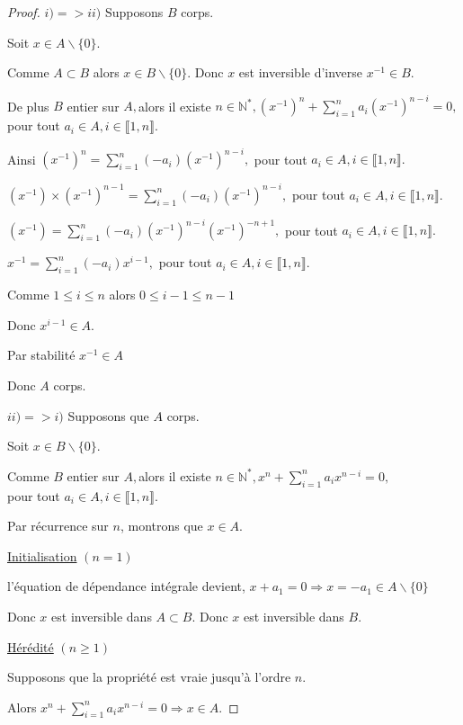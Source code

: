 \begin{proof}
	$i)=>ii)$ Supposons $B$ corps.
	
	Soit $x\in A\backslash \{0\}.$
	
	Comme $A\subset B$ alors $x\in B\backslash \{0\}$. Donc $x$ est inversible
	d'inverse $x^{-1}\in B.$
	
	De plus $B$ entier sur $A,$alors il existe $n\in \mathbb{N}^{\ast },(x^{-1})^{n}+\sum\limits_{i=1}^{n}a_{i}(x^{-1})^{n-i}=0,$ pour tout 
	$a_{i}\in A,i\in \llbracket 1, n \rrbracket.$
	
	Ainsi $(x^{-1})^{n}=\sum\limits_{i=1}^{n}(-a_{i})(x^{-1})^{n-i},$ pour tout $%
	a_{i}\in A,i\in \llbracket 1, n \rrbracket.$
	
	$(x^{-1})\times (x^{-1})^{n-1}=\sum\limits_{i=1}^{n}(-a_{i})(x^{-1})^{n-i},$
	pour tout $a_{i}\in A,i\in \llbracket 1, n \rrbracket.$
	
	$(x^{-1})=\sum\limits_{i=1}^{n}(-a_{i})(x^{-1})^{n-i}(x^{-1})^{-n+1},$ pour
	tout $a_{i}\in A,i\in \llbracket 1, n \rrbracket.$
	
	$x^{-1}=\sum\limits_{i=1}^{n}(-a_{i})x^{i-1},$ pour tout $a_{i}\in A,i\in
	\llbracket 1, n \rrbracket.$
	
	Comme  $1\leq i\leq n$ alors $0\leq i-1\leq n-1$
	
	Donc $x^{i-1}\in A$.
	
	Par stabilité $x^{-1}\in A$
	
	Donc $A$ corps.
	
	$ii)=>i)$ Supposons que $A$ corps.
	
	Soit $x\in B\backslash \{0\}.$
	
	Comme $B$ entier sur $A,$alors il existe $n\in \mathbb{N}^{\ast },x^{n}+\sum\limits_{i=1}^{n}a_{i}x^{n-i}=0,$\\ pour tout $a_{i}\in
	A,i\in \llbracket 1, n \rrbracket.$
	\newpage
	
	Par récurrence sur $n$, montrons que $x\in A.$
	
	\underline{Initialisation} $(n=1)$
	
	l'équation de dépendance intégrale devient, $x+a_{1}=0%
	\Rightarrow x=-a_{1}\in A\backslash \{0\}$
	
	Donc $x$ est inversible dans $A\subset B.$ Donc $x$ est inversible dans $B.$
	
	\underline{Hérédité} $(n\geq 1)$
	
	Supposons que la propriété est vraie jusqu'à l'ordre $n.$
	
	Alors $x^{n}+\sum\limits_{i=1}^{n}a_{i}x^{n-i}=0\Rightarrow x\in A.$
	

\end{proof}
